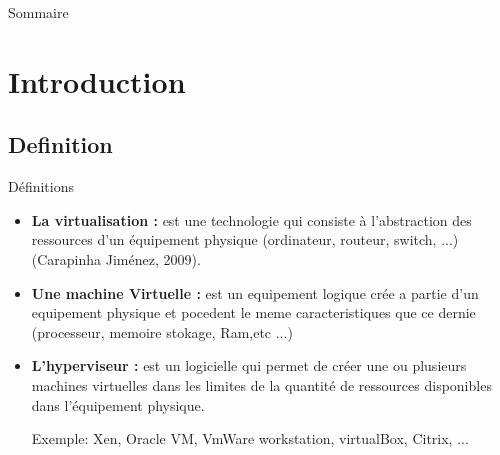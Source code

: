 \documentclass[12pt, c]{beamer}
\begin{document}
\begin{frame}{\scriptsize Sommaire}
\transwipe
\scriptsize
  \tableofcontents
\end{frame}

\section{Introduction}


	\subsection{Definition}
		\begin{frame}{Définitions}
		\transwipe
	
		\vspace{-0.25cm}
			\begin{block}{}
				 \begin{itemize}
			 		\item 
			 			\begin{flushleft}
			 				\textbf{La virtualisation : } est une technologie qui consiste à
			 				l’abstraction des ressources d’un équipement physique (ordinateur, routeur,
			 				switch, ...) (Carapinha  Jiménez, 2009). 
			 			\end{flushleft}
			 		\item
			 			\begin{flushleft}
			 				\textbf{Une machine Virtuelle : } est un equipement logique crée a partie 
			 				d'un equipement physique et pocedent le meme caracteristiques que ce dernie
			 				(processeur, memoire stokage, Ram,etc ...)
						\end{flushleft}			 			 
			 		\item
			 			\begin{flushleft}
			 				\textbf{L’hyperviseur : } est un logicielle qui  permet de
			 				créer une ou plusieurs machines virtuelles dans les limites de la quantité
			 				de ressources disponibles dans l’équipement physique.
			 				
			 				\begin{flushleft}
			 				Exemple: Xen, Oracle VM, VmWare workstation, virtualBox, Citrix, ...
			 				\end{flushleft}
			 			\end{flushleft}
			 	\end{itemize}
	
			\end{block}	
		\end{frame}
\end{document}
